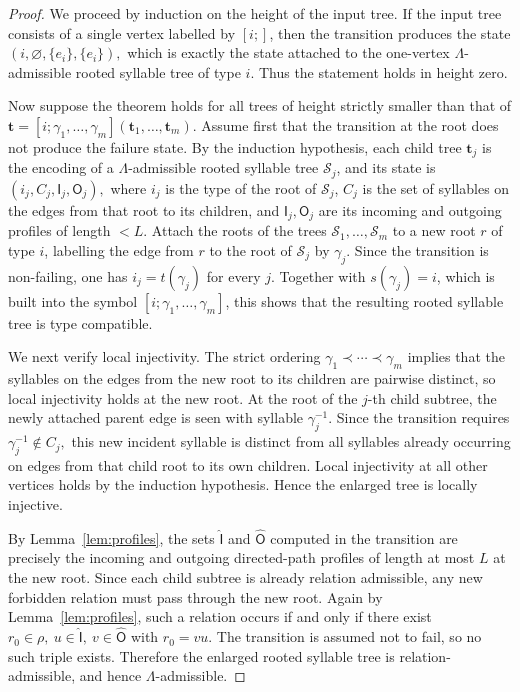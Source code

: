 \documentclass[11pt,a4paper]{amsart}
\theoremstyle{definition}
\theoremstyle{plain}
\theoremstyle{remark}
\numberwithin{equation}{section}
\begin{document}
\begin{proof}
We proceed by induction on the height of the input tree. If the input tree consists of a single vertex labelled by $[i;]$, then the transition produces the state $(i,\varnothing,\{e_i\},\{e_i\}),$ which is exactly the state attached to the one-vertex $\Lambda$-admissible rooted syllable tree of type $i$. Thus the statement holds in height zero.

Now suppose the theorem holds for all trees of height strictly smaller than that of $\mathbf t=[i;\gamma_1,\ldots,\gamma_m](\mathbf t_1,\ldots,\mathbf t_m).$ Assume first that the transition at the root does not produce the failure state. By the induction hypothesis, each child tree $\mathbf t_j$ is the encoding of a $\Lambda$-admissible rooted syllable tree $\mathcal S_j$, and its state is $(i_j,C_j,\mathsf I_j,\mathsf O_j),$ where $i_j$ is the type of the root of $\mathcal S_j$, $C_j$ is the set of syllables on the edges from that root to its children, and $\mathsf I_j,\mathsf O_j$ are its incoming and outgoing profiles of length $<L$. Attach the roots of the trees $\mathcal S_1,\ldots,\mathcal S_m$ to a new root $r$ of type $i$, labelling the edge from $r$ to the root of $\mathcal S_j$ by $\gamma_j$. Since the transition is non-failing, one has $i_j=t(\gamma_j)$ for every $j$. Together with $s(\gamma_j)=i$, which is built into the symbol $[i;\gamma_1,\ldots,\gamma_m]$, this shows that the resulting rooted syllable tree is type compatible.

We next verify local injectivity. The strict ordering $\gamma_1\prec\cdots\prec\gamma_m$ implies that the syllables on the edges from the new root to its children are pairwise distinct, so local injectivity holds at the new root. At the root of the $j$-th child subtree, the newly attached parent edge is seen with syllable $\gamma_j^{-1}$. Since the transition requires $\gamma_j^{-1}\notin C_j,$ this new incident syllable is distinct from all syllables already occurring on edges from that child root to its own children. Local injectivity at all other vertices holds by the induction hypothesis. Hence the enlarged tree is locally injective.

By Lemma~\ref{lem:profiles}, the sets $\widehat{\mathsf I}$ and $\widehat{\mathsf O}$ computed in the transition are precisely the incoming and outgoing directed-path profiles of length at most $L$ at the new root. Since each child subtree is already relation admissible, any new forbidden relation must pass through the new root. Again by Lemma~\ref{lem:profiles}, such a relation occurs if and only if there exist $
r_0\in\rho,\ 
u\in\widehat{\mathsf I},\ 
v\in\widehat{\mathsf O}$ with $r_0=vu.$ The transition is assumed not to fail, so no such triple exists. Therefore the enlarged rooted syllable tree is relation-admissible, and hence $\Lambda$-admissible.


\end{proof}
\end{document}
